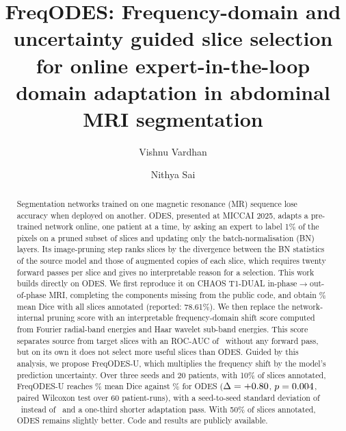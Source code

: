 \documentclass[a4paper,fleqn]{cas-dc}
\begin{document}
\let\WriteBookmarks\relax
\renewcommand{\topfraction}{0.9}
\renewcommand{\dbltopfraction}{0.9}
\renewcommand{\bottomfraction}{0.6}
\renewcommand{\textfraction}{0.07}
\renewcommand{\floatpagefraction}{0.8}
\renewcommand{\dblfloatpagefraction}{0.8}
\setcounter{topnumber}{3}
\setcounter{dbltopnumber}{3}
\setcounter{totalnumber}{5}


\title [mode = title]{FreqODES: Frequency-domain and uncertainty guided slice selection for online expert-in-the-loop domain adaptation in abdominal MRI segmentation}

\author[1]{Vishnu Vardhan}
\author[1]{Nithya Sai}

\begin{abstract}
Segmentation networks trained on one magnetic resonance (MR) sequence lose accuracy when deployed on another. ODES, presented at MICCAI 2025, adapts a pre-trained network online, one patient at a time, by asking an expert to label 1\% of the pixels on a pruned subset of slices and updating only the batch-normalisation (BN) layers. Its image-pruning step ranks slices by the divergence between the BN statistics of the source model and those of augmented copies of each slice, which requires twenty forward passes per slice and gives no interpretable reason for a selection. This work builds directly on ODES. We first reproduce it on CHAOS T1-DUAL in-phase$\rightarrow$out-of-phase MRI, completing the components missing from the public code, and obtain \DODESK\% mean Dice with all slices annotated (reported: 78.61\%). We then replace the network-internal pruning score with an interpretable frequency-domain shift score computed from Fourier radial-band energies and Haar wavelet sub-band energies. This score separates source from target slices with an ROC-AUC of \AUCFFT\ without any forward pass, but on its own it does not select more useful slices than ODES. Guided by this analysis, we propose FreqODES-U, which multiplies the frequency shift by the model's prediction uncertainty. Over three seeds and 20 patients, with 10\% of slices annotated, FreqODES-U reaches \VFeTenMean\% mean Dice against \VBnTenMean\% for ODES ($\Delta=+0.80$, $p=0.004$, paired Wilcoxon test over 60 patient-runs), with a seed-to-seed standard deviation of \VFeTenStd\ instead of \VBnTenStd\ and a one-third shorter adaptation pass. With 50\% of slices annotated, ODES remains slightly better. Code and results are publicly available.
\end{abstract}
\end{document}
